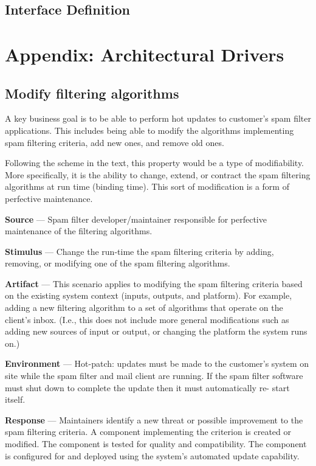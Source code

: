 \documentclass[11pt,letterpaper]{article}
\begin{document}
\subsection{Interface Definition}


\clearpage
\appendix
\section{Appendix: Architectural Drivers}

\subsection{Modify filtering algorithms}
A key business goal is to be able to perform hot updates to customer’s spam
filter applications. This includes being able to modify the algorithms
implementing spam filtering criteria, add new ones, and remove old ones.
 
Following the scheme in the text, this property would be a type of
modifiability. More specifically, it is the ability to change, extend, or
contract the spam filtering algorithms at run time (binding time). This sort
of modification is a form of perfective maintenance.

\textbf{Source} --- Spam filter developer/maintainer responsible for
perfective maintenance of the filtering algorithms.

\textbf{Stimulus} --- Change the run-time the spam filtering criteria by
adding, removing, or modifying one of the spam filtering algorithms.

\textbf{Artifact} --- This scenario applies to modifying the spam filtering
criteria based on the existing system context (inputs, outputs, and
platform). For example, adding a new filtering algorithm to a set of
algorithms that operate on the client’s inbox. (I.e., this does not include
more general modifications such as adding new sources of input or output, or
changing the platform the system runs on.)

\textbf{Environment} --- Hot-patch: updates must be made to the customer’s
system on site while the spam filter and mail client are running. If the spam
filter software must shut down to complete the update then it must
automatically re- start itself.

\textbf{Response} --- Maintainers identify a new threat or possible
improvement to the spam filtering criteria. A component implementing the
criterion is created or modified. The component is tested for quality and
compatibility. The component is configured for and deployed using the system’s
automated update capability.
\end{document}
